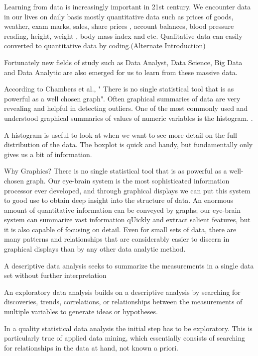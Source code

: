 
Learning from data is increasingly important in 21st century. We encounter data in our lives on daily basis mostly quantitative data such as prices of goods, weather, exam marks, sales, share prices , account balances, blood pressure reading, height, weight , body mass index and etc. Qualitative data can easily converted to quantitative data by coding.(Alternate Introduction)

Fortunately new fields of study such as Data Analyst, Data Science, Big Data and Data Analytic are also emerged for us to learn from these massive data.  

According to Chambers et al., " There is no single statistical tool that is as powerful as a well chosen graph". Often graphical summaries of data are very revealing and helpful in detecting outliers. One of the most commonly used and understood graphical summaries of values of numeric variables is the histogram. \cite{francis2005dancing}.

A histogram is useful to look at when we want to see more detail on the full distribution
of the data. The boxplot is quick and handy, but fundamentally only gives us a bit of
information. \cite{peng2012exploratory}

Why Graphics?
There is no single statistical tool that is as powerful as a well-chosen
graph. Our eye-brain system is the most sophisticated information
processor ever developed, and through graphical displays we can put
this system to good use to obtain deep insight into the structure of data.
An enormous amount of quantitative information can be conveyed by
graphs; our eye-brain system can summarize vast information qUickly
and extract salient features, but it is also capable of focusing on detail.
Even for small sets of data, there are many patterns and relationships
that are considerably easier to discern in graphical displays than by any
other data analytic method.\cite{john1983graphical}

A descriptive data analysis seeks to summarize the measurements
in a single data set without further interpretation \cite{leek2015elements}

An exploratory data analysis builds on a descriptive analysis
by searching for discoveries, trends, correlations, or relationships
between the measurements of multiple variables to
generate ideas or hypotheses. \cite{leek2015elements}

In a quality statistical data analysis the initial step has to be exploratory. This is
particularly true of applied data mining, which essentially consists of searching
for relationships in the data at hand, not known a priori.\cite{giudici2005applied}


